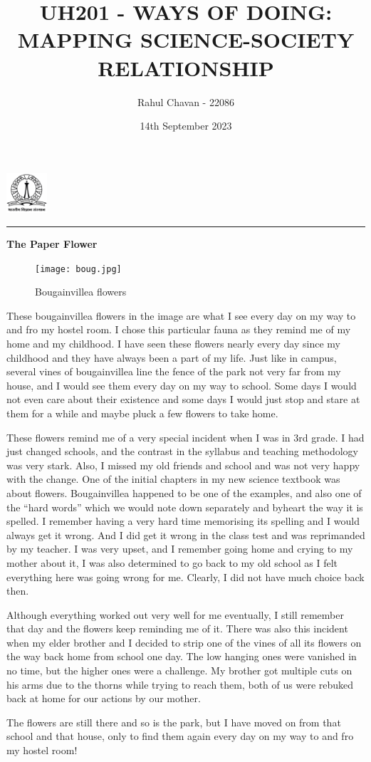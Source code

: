 \documentclass{article}
\title{\textbf{UH201 - WAYS OF DOING: MAPPING SCIENCE-SOCIETY RELATIONSHIP}}
\author{Rahul Chavan - 22086}
\date{14th September 2023}
\renewcommand{\maketitle}{
 \begin{center}
    \includegraphics[width=1.5cm]{IISc_Master_Seal_Black.jpg}
    \vspace{0.5cm}

    \Large
    \textbf{\thetitle}
    
    \vspace{0.3cm}
    
    \large
    \theauthor
    
    \vspace{0.2cm}

    
    
    \large
    \thedate
    \vspace{0.2cm}

    \hrule  
    
    
  
  \end{center}
}
\begin{document}
\maketitle
  \begin{center} \Large
    \textbf{The Paper Flower}
  \end{center} 



\begin{figure}[htbp] 
  \centering 
  \texttt{[image: boug.jpg]} 
  \caption{Bougainvillea flowers}
  \label{fig: Linear fitting} 
\end{figure}

 \vspace{0.2cm}

 These bougainvillea flowers in the image are what I see every day on my way to and fro my hostel room.
 I chose this particular fauna as they remind me of my home and my childhood.
 I have seen these flowers nearly every day since my childhood and they have always been a part of my life.
 Just like in campus, several vines of bougainvillea line the fence of the park not very far from my house,
 and I would see them every day on my way to school.
 Some days I would not even care about their existence and some days I would just stop and stare at them for a while and maybe pluck
 a few flowers to take home.

 These flowers remind me of a very special incident when I was in 3rd grade.
 I had just changed schools, and the contrast in the syllabus and teaching methodology was very stark.
 Also, I missed my old friends and school and was not very happy with the change.
 One of the initial chapters in my new science textbook was about flowers.
 Bougainvillea happened to be one of the examples,
 and also one of the \enquote{hard words} which we would note down separately and byheart the way it is spelled.
 I remember having a very hard time memorising its spelling and I would always get it wrong.
 And I did get it wrong in the class test and was reprimanded by my teacher.
 I was very upset, and I remember going home and crying to my mother about it, I was
 also determined to go back to my old school as I felt everything here was going wrong for me.
 Clearly, I did not have much choice back then.
 

 Although everything worked out very well for me eventually, I still remember that day and the flowers
 keep reminding me of it.
 There was also this incident when my elder brother and I decided to strip one of the vines of all its flowers on the way back home from school one day.
 The low hanging ones were vanished in no time, but the higher ones were a challenge.
 My brother got multiple cuts on his arms due to the thorns while trying to reach them,
 both of us were rebuked back at home for our actions by our mother.

 
 The flowers are still there and so is the park, but I have moved on from that school and that house,
 only to find them again every day on my way to and fro my hostel room!
 
 
\end{document}
